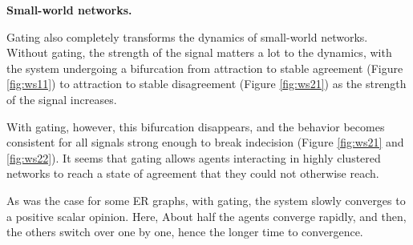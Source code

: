 \documentclass[]{article}
\begin{document}
\newpage

\textbf{Small-world networks.}

Gating also completely transforms the dynamics of small-world networks. Without gating, the strength of the signal matters a lot to the dynamics, with the system undergoing a bifurcation from attraction to stable agreement (Figure \ref{fig:ws11}) to attraction to stable disagreement (Figure \ref{fig:ws21}) as the strength of the signal increases.

With gating, however, this bifurcation disappears, and the behavior becomes consistent for all signals strong enough to break indecision (Figure \ref{fig:ws21} and \ref{fig:ws22}). It seems that gating allows agents interacting in highly clustered networks to reach a state of agreement that they could not otherwise reach.

As was the case for some ER graphs, with gating, the system slowly converges to a positive scalar opinion. Here, About half the agents converge rapidly, and then, the others switch over one by one, hence the longer time to convergence.
\end{document}
